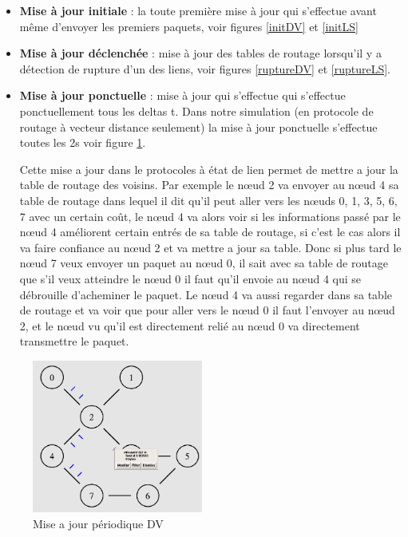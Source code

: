 \documentclass[11pt]{article}
\begin{document}
\begin{itemize}
	\item \textbf{Mise à jour initiale} : la toute première mise à jour qui s’effectue avant même d’envoyer les premiers paquets, voir figures \ref{initDV} et \ref{initLS}
	\item \textbf{Mise à jour déclenchée} : mise à jour des tables de routage lorsqu’il y a détection de rupture d’un des liens, voir figures \ref{ruptureDV} et \ref{ruptureLS}.
	\item \textbf{Mise à jour ponctuelle} : mise à jour qui s’effectue qui s’effectue ponctuellement tous les deltas t. Dans notre simulation (en protocole de routage à vecteur distance seulement) la mise à jour ponctuelle s’effectue toutes les 2s voir figure \ref{misePeriodique}.
	
Cette mise a jour dans le protocoles à état de lien permet de mettre a jour la table de routage des voisins. Par exemple le nœud 2 va envoyer au nœud 4 sa table de routage dans lequel il dit qu'il peut aller vers les nœuds 0, 1, 3, 5, 6, 7 avec un certain coût, le nœud 4 va alors voir si les informations passé par le nœud 4 améliorent certain entrés de sa table de routage, si c'est le cas alors il va faire confiance au nœud 2 et va mettre a jour sa table. Donc si plus tard le nœud 7 veux envoyer un paquet au nœud 0, il sait avec sa table de routage que s'il veux atteindre le nœud 0 il faut qu'il envoie au nœud 4 qui se débrouille d'acheminer le paquet. Le nœud 4 va aussi regarder dans sa table de routage et va voir que pour aller vers le nœud 0 il faut l'envoyer au nœud 2, et le nœud vu qu'il est directement relié au nœud 0 va directement transmettre le paquet.
\end{itemize}

\begin{figure}[H]
	\begin{center}
		\includegraphics[width=0.5\textwidth]{assets/tp2/miseAjourPeriodiqueDV.png}
	\end{center}
	\caption{Mise a jour périodique DV}
	\label{misePeriodique}
\end{figure}
\end{document}

